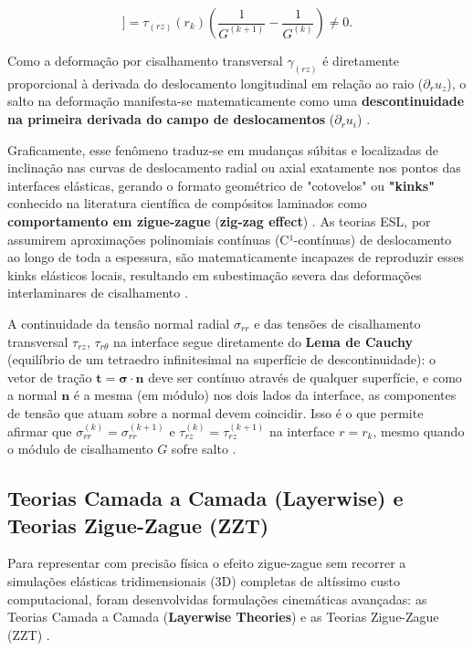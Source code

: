 \begin{equation}
    [[ \gamma_{(rz)} ]] = \tau_{(rz)}(r_k) \left( \frac{1}{G^{(k+1)}} - \frac{1}{G^{(k)}} \right) \neq 0. 
\end{equation} \label{eq:jump_shear}

Como a deformação por cisalhamento transversal $\gamma_{(rz)}$ é diretamente proporcional à derivada do deslocamento longitudinal em relação ao raio ($\partial_r u_z$), o salto na deformação manifesta-se matematicamente como uma \textbf{descontinuidade na primeira derivada do campo de deslocamentos} ($\partial_r u_i$) \cite{RMJones2018}.

Graficamente, esse fenômeno traduz-se em mudanças súbitas e localizadas de inclinação nas curvas de deslocamento radial ou axial exatamente nos pontos das interfaces elásticas, gerando o formato geométrico de "cotovelos" ou \textbf{"kinks"} conhecido na literatura científica de compósitos laminados como \textbf{comportamento em zigue-zague} (\textbf{zig-zag effect}) \cite{RMJones2018}. As teorias ESL, por assumirem aproximações polinomiais contínuas (C¹-contínuas) de deslocamento ao longo de toda a espessura, são matematicamente incapazes de reproduzir esses kinks elásticos locais, resultando em subestimação severa das deformações interlaminares de cisalhamento \cite{RMJones2018}.

A continuidade da tensão normal radial $\sigma_{rr}$ e das tensões de cisalhamento transversal $\tau_{rz}$, $\tau_{r\theta}$ na interface segue diretamente do \textbf{Lema de Cauchy} (equilíbrio de um tetraedro infinitesimal na superfície de descontinuidade): o vetor de tração $\mathbf{t} = \boldsymbol{\sigma}\cdot\mathbf{n}$ deve ser contínuo através de qualquer superfície, e como a normal $\mathbf{n}$ é a mesma (em módulo) nos dois lados da interface, as componentes de tensão que atuam sobre a normal devem coincidir. Isso é o que permite afirmar que $\sigma_{rr}^{(k)} = \sigma_{rr}^{(k+1)}$ e $\tau_{rz}^{(k)} = \tau_{rz}^{(k+1)}$ na interface $r = r_k$, mesmo quando o módulo de cisalhamento $G$ sofre salto \cite{Sadd2009}.

\subsection{Teorias Camada a Camada (\textbf{Layerwise}) e Teorias Zigue-Zague (ZZT)}

Para representar com precisão física o efeito zigue-zague sem recorrer a simulações elásticas tridimensionais (3D) completas de altíssimo custo computacional, foram desenvolvidas formulações cinemáticas avançadas: as Teorias Camada a Camada (\textbf{Layerwise Theories}) e as Teorias Zigue-Zague (ZZT) \cite{PartonReport}.


